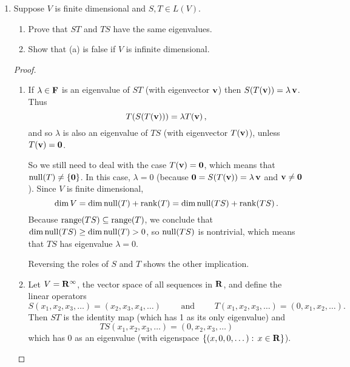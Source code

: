\documentclass[11pt]{amsart}
\begin{document}
\begin{enumerate}[(1)]
\begin{proof}
\begin{enumerate}
\item We found a matrix representation of $T$ that is upper triangular with no zero on the diagonal, so by a theorem proved in class $T$ is invertible. \qedhere

\end{enumerate}
\end{proof}

\item Suppose $V$ is finite dimensional and $S, T \in L(V)$.
  \begin{enumerate}
  \item Prove that $ST$ and $TS$ have the same eigenvalues.
  \item Show that (a) is false if $V$ is infinite dimensional.
  \end{enumerate}

\begin{proof}
\begin{enumerate}

\item If $\lambda \in \mathbf{F}$ is an eigenvalue of $ST$ (with eigenvector $\mathbf v$) then $S(T(\mathbf v)) = \lambda \, \mathbf v$.
Thus
\[
  T(S(T(\mathbf v))) = \lambda T(\mathbf v) \, ,
\]
and so $\lambda$ is also an eigenvalue of $TS$ (with eigenvector $T(\mathbf v)$), unless $T(\mathbf v) = \mathbf 0$.

So we still need to deal with the case $T(\mathbf v) = \mathbf 0$, which means that $\operatorname{null}(T) \ne \{\mathbf 0\}$. In this case, $\lambda = 0$ (because $\mathbf 0 = S(T(\mathbf v)) = \lambda \, \mathbf v$ and $\mathbf v \ne \mathbf 0$).
Since $V$ is finite dimensional,
\[
  \dim V = \dim \operatorname{null}(T) + \operatorname{rank}(T) = \dim \operatorname{null}(TS) + \operatorname{rank}(TS) \, .
\]
Because $\operatorname{range}(TS) \subseteq \operatorname{range}(T)$, we conclude that $\dim \operatorname{null}(TS) \ge \dim \operatorname{null}(T) > 0$, so $\operatorname{null}(TS)$ is nontrivial, which means that $TS$ has eigenvalue $\lambda = 0$.

Reversing the roles of $S$ and $T$ shows the other implication.

\item Let $V = \mathbf{R}^\infty$, the vector space of all sequences in $\mathbf{R}$, and define the linear operators
\[
  S \left( x_1, x_2, x_3, \dots \right) = \left( x_2, x_3, x_4, \dots \right) 
  \qquad \text{ and } \qquad
  T \left( x_1, x_2, x_3, \dots \right) = \left( 0, x_1, x_2, \dots \right) .
\]
Then $ST$ is the identity map (which has 1 as its only eigenvalue) and
\[
  TS \left( x_1, x_2, x_3, \dots \right) = \left( 0, x_2, x_3, \dots \right)
\]
which has 0 as an eigenvalue (with eigenspace $\left\{ \left( x, 0, 0, \dots \right) : \, x \in \mathbf{R} \right\}$). \qedhere


\end{enumerate}
\end{proof}
\end{enumerate}
\end{document}
